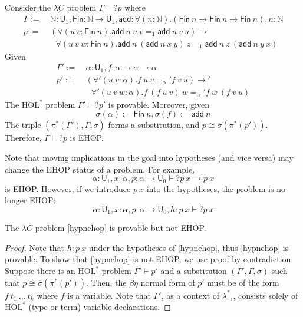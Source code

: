 \begin{example} Consider the $\lambda C$ problem $\Gamma \vdash? p$ where
\begin{align*}
  \Gamma := \ & \mathbb{N} : \mathsf{U}_1, \mathsf{Fin} : \mathbb{N} \to \mathsf{U}_1,
  \mathsf{add} : \forall (n : \mathbb{N}). (\mathsf{Fin} \ n \to \mathsf{Fin} \ n \to \mathsf{Fin} \ n), n : \mathbb{N} \\
  p := \ & (\forall (u \ v : \mathsf{Fin} \ n). \mathsf{add} \ n \ u \ v =_1 \mathsf{add} \ n \ v \ u) \to \\
  & \ \ \ \forall (u \ v \ w : \mathsf{Fin} \ n). \mathsf{add} \ n \ (\mathsf{add} \ n \ x \ y) \ z =_1 \mathsf{add} \ n \ z \ (\mathsf{add} \ n \ y \ x)
\end{align*}
Given
\begin{align*}
  \Gamma' := \ & \alpha : \mathsf{U}_1, f : \alpha \to \alpha \to \alpha \\
  p' := \ & (\forall' (u \ v : \alpha). f \ u \ v =_\alpha' f \ v \ u) \to' \\
  & \ \ \ \forall' (u \ v \ w : \alpha). f \ (f \ u \ v) \ w =_\alpha' f \ w \ (f \ v \ u)
\end{align*}
The $\text{HOL}^*$ problem $\Gamma' \vdash? p'$ is provable. Moreover, given
$$\sigma(\alpha) := \mathsf{Fin} \ n, \sigma(f) := \mathsf{add} \ n$$
The triple $(\pi^*(\Gamma'), \Gamma, \sigma)$ forms a substitution, and $p \cong \overline{\sigma}(\pi^*(p'))$.
Therefore, $\Gamma \vdash? p$ is EHOP.
\end{example}

Note that moving implications in the goal into hypotheses (and vice versa) may
change the EHOP status of a problem. For example,
$$\alpha : \mathsf{U}_1, x : \alpha, p : \alpha \to \mathsf{U}_0 \vdash? p \ x \to p \ x$$
is EHOP. However, if we introduce $p \ x$ into the hypotheses, the problem is no longer EHOP:
\begin{equation}\label{hypnehop}
  \alpha : \mathsf{U}_1, x : \alpha, p : \alpha \to \mathsf{U}_0, h : p \ x \vdash? p \ x
\end{equation}

\begin{theorem}
  The $\lambda C$ problem \eqref{hypnehop} is provable but not EHOP.
\end{theorem}
\begin{proof}
  Note that $h : p \ x$ under the hypotheses of \eqref{hypnehop}, thus \eqref{hypnehop} is provable.
  To show that \eqref{hypnehop} is not EHOP, we use proof by contradiction. Suppose there
  is an $\text{HOL}^*$ problem $\Gamma' \vdash p'$ and a substitution $(\Gamma', \Gamma, \sigma)$ such
  that $p \cong \overline{\sigma}(\pi^*(p'))$. Then, the $\beta\eta$ normal form of $p'$ must be of the form
  $f \ t_1 \ \dots \ t_k$ where $f$ is a variable. Note that $\Gamma'$, as a context of $\lambda_\to^*$,
  consists solely of $\text{HOL}^*$ (type or term) variable declarations.
\end{proof}

